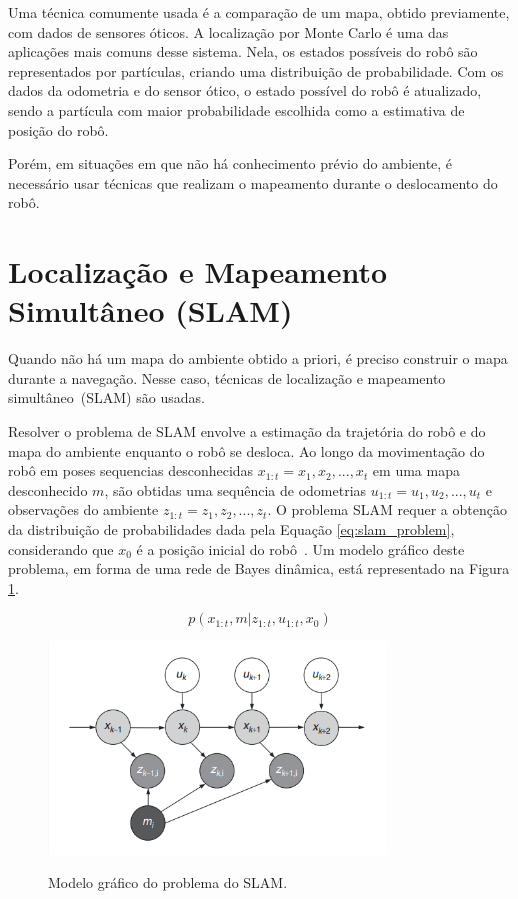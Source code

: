 \documentclass[repeatfields,xlists,xpacks,oneside,yearsonly]{ufrgscca}
\begin{document}
Uma técnica comumente usada é a comparação de um mapa, obtido
previamente, com dados de sensores óticos. A localização por Monte
Carlo é uma das aplicações mais comuns desse sistema. Nela, os
estados possíveis do robô são representados por partículas, criando
uma distribuição de probabilidade. Com os dados da odometria e do
sensor ótico, o estado possível do robô é atualizado, sendo a
partícula com maior probabilidade escolhida como a estimativa de
posição do robô.

Porém, em situações em que não há conhecimento prévio do ambiente, é
necessário usar técnicas que realizam o mapeamento durante o
deslocamento do robô.

\section{Localização e Mapeamento Simultâneo (SLAM)}

Quando não há um mapa do ambiente obtido a priori, é preciso
construir o mapa durante a navegação. Nesse caso, técnicas de
localização e mapeamento simultâneo~(SLAM) são usadas.

Resolver o problema de SLAM envolve a estimação da trajetória do robô
e do mapa do ambiente enquanto o robô se desloca. Ao longo da
movimentação do robô em poses sequencias desconhecidas $x_{1:t} = {
            x_1, x_2, ..., x_t }$ em uma mapa desconhecido $m$, são obtidas uma
sequência de odometrias $u_{1:t} = {u_1, u_2, ..., u_t}$ e
observações do ambiente $z_{1:t} = {z_1, z_2, ..., z_t}$. O problema
SLAM requer a obtenção da distribuição de probabilidades dada pela
Equação \ref{eq:slam_problem}, considerando que $x_0$ é a posição
inicial do robô~\cite{slam_tutorial_part_i}. Um modelo gráfico deste
problema, em forma de uma rede de Bayes dinâmica, está representado
na Figura \ref{fig:slam_algo}.

\begin{equation}
    \label{eq:slam_problem}
    p(x_{1:t}, m | z_{1:t}, u_{1:t}, x_0)
\end{equation}

\begin{figure}[h]
    {
        \centering
        \caption{Modelo gráfico do problema do SLAM.}
        \label{fig:slam_algo}
        \includegraphics[width=0.8\textwidth]{graphic_slam_representation.png}\\
    }
    {}
\end{figure}
\end{document}
